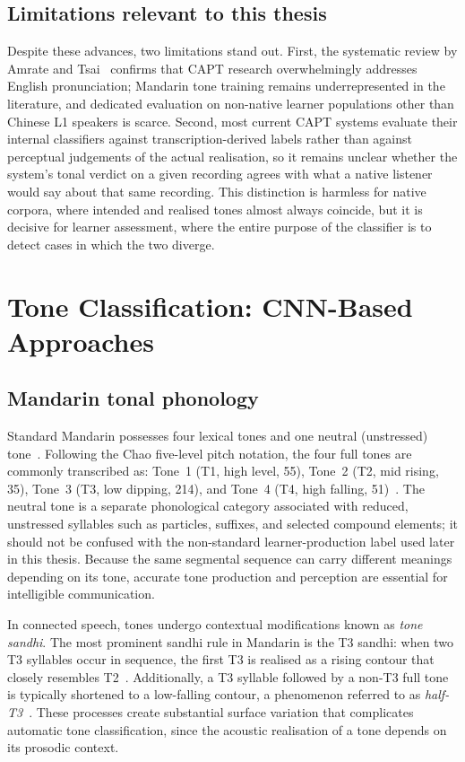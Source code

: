 \subsection{Limitations relevant to this thesis}

Despite these advances, two limitations stand out. First, the systematic review by Amrate and Tsai~\cite{zolnay2024} confirms that CAPT research overwhelmingly addresses English pronunciation; Mandarin tone training remains underrepresented in the literature, and dedicated evaluation on non-native learner populations other than Chinese L1 speakers is scarce. Second, most current CAPT systems evaluate their internal classifiers against transcription-derived labels rather than against perceptual judgements of the actual realisation, so it remains unclear whether the system's tonal verdict on a given recording agrees with what a native listener would say about that same recording. This distinction is harmless for native corpora, where intended and realised tones almost always coincide, but it is decisive for learner assessment, where the entire purpose of the classifier is to detect cases in which the two diverge.

\section{Tone Classification: CNN-Based Approaches}
\label{sec:sota:cnn}

\subsection{Mandarin tonal phonology}

Standard Mandarin possesses four lexical tones and one neutral (unstressed) tone~\cite{jongman2006tones,zahner2022toneexperience}. Following the Chao five-level pitch notation, the four full tones are commonly transcribed as: Tone~1 (T1, high level, 55), Tone~2 (T2, mid rising, 35), Tone~3 (T3, low dipping, 214), and Tone~4 (T4, high falling, 51)~\cite{huang2011language}. The neutral tone is a separate phonological category associated with reduced, unstressed syllables such as particles, suffixes, and selected compound elements; it should not be confused with the non-standard learner-production label used later in this thesis. Because the same segmental sequence can carry different meanings depending on its tone, accurate tone production and perception are essential for intelligible communication.

In connected speech, tones undergo contextual modifications known as \emph{tone sandhi}. The most prominent sandhi rule in Mandarin is the T3 sandhi: when two T3 syllables occur in sequence, the first T3 is realised as a rising contour that closely resembles T2~\cite{huang2011language,gao2021processing}. Additionally, a T3 syllable followed by a non-T3 full tone is typically shortened to a low-falling contour, a phenomenon referred to as \emph{half-T3}~\cite{qin2022sandhi}. These processes create substantial surface variation that complicates automatic tone classification, since the acoustic realisation of a tone depends on its prosodic context.

